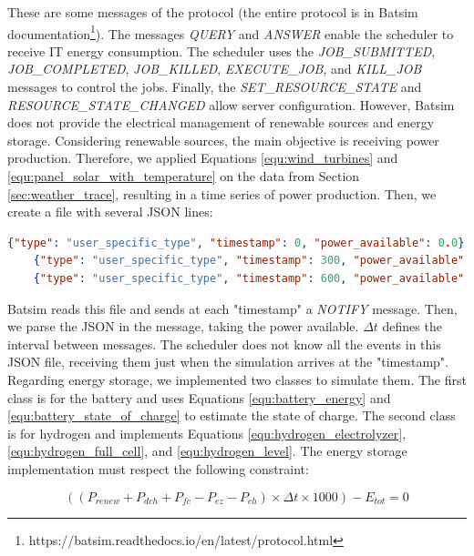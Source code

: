 These are some messages of the protocol (the entire protocol is in Batsim documentation\footnote{https://batsim.readthedocs.io/en/latest/protocol.html}). The messages \textit{QUERY} and \textit{ANSWER} enable the scheduler to receive IT energy consumption. The scheduler uses the \textit{JOB\_SUBMITTED}, \textit{JOB\_COMPLETED}, \textit{JOB\_KILLED}, \textit{EXECUTE\_JOB}, and \textit{KILL\_JOB} messages to control the jobs. Finally, the \textit{SET\_RESOURCE\_STATE} and \textit{RESOURCE\_STATE\_CHANGED} allow server configuration. However, Batsim does not provide the electrical management of renewable sources and energy storage. Considering renewable sources, the main objective is receiving power production. Therefore, we applied Equations \ref{equ:wind_turbines} and \ref{equ:panel_solar_with_temperature} on the data from Section \ref{sec:weather_trace}, resulting in a time series of power production. Then, we create a file with several JSON lines:

\begin{lstlisting}[language=json,firstnumber=1]
    {"type": "user_specific_type", "timestamp": 0, "power_available": 0.0}
    {"type": "user_specific_type", "timestamp": 300, "power_available": 460.4}
    {"type": "user_specific_type", "timestamp": 600, "power_available": 5172.26}
\end{lstlisting}

Batsim reads this file and sends at each "timestamp" a \textit{NOTIFY} message. Then, we parse the JSON in the message, taking the power available. $\Delta t$ defines the interval between messages. The scheduler does not know all the events in this JSON file, receiving them just when the simulation arrives at the "timestamp". Regarding energy storage, we implemented two classes to simulate them. The first class is for the battery and uses Equations \ref{equ:battery_energy} and \ref{equ:battery_state_of_charge} to estimate the state of charge. The second class is for hydrogen and implements Equations \ref{equ:hydrogen_electrolyzer}, \ref{equ:hydrogen_full_cell}, and \ref{equ:hydrogen_level}. The energy storage implementation must respect the following constraint:

\begin{equation}
    \label{equ:energy_diff}
    ((P_{renew} + P_{dch} + P_{fc} - P_{ez} - P_{ch}) \times \Delta t \times 1000) - E_{tot} = 0
\end{equation}

